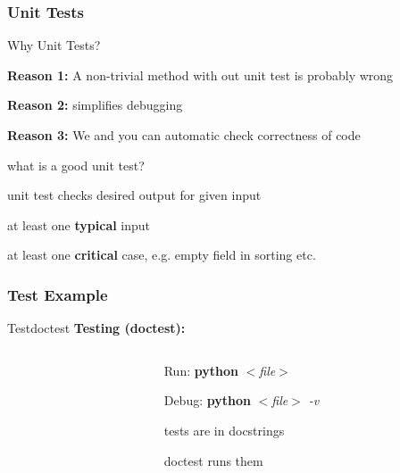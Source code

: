 \documentclass[notes=hide,pdftex,14pt]{beamer}
\def\LectureProgLanguage{python}
\newcommand{\codeslide}[2]{#2}%
\newcommand{\codeslide}[2]{%
    \ifthenelse{\equal{#1}{\LectureProgLanguage}}{#2}{}%
  }%
\begin{document}

\begin{frame}
  \frametitle{Unit Tests}
  \begin{tabl}
  \item Why Unit Tests?
  \eitem
  \begin{tabp}[0.9]
  \item \textbf{Reason 1:} A non-trivial method with out unit test is
    probably wrong
  \item \textbf{Reason 2:} simplifies debugging
  \item \textbf{Reason 3:} We and you can automatic check correctness of code
  \end{tabp}
\eitem
\item what is a good unit test?
\eitem
\begin{tabp}[0.9]
\item unit test checks desired output for given input
\item at least one \textbf{typical} input
\item at least one \textbf{critical} case, e.g. empty field in sorting etc.
\end{tabp}

  \end{tabl}
\end{frame}


\codeslide{python}{
\subsubsection{Test Example}
\begin{frame}{Test}{doctest}
  \textbf{Testing (doctest):}
  \vspace{-1.0em}
  \begin{columns}
    \begin{column}[t]{0.45\linewidth}
      
    \end{column}
    \begin{column}[t]{0.6\linewidth}
      \begin{tabl}
        \item
          Run: \textbf{python} \textit{$<$file$>$}
        \item
          Debug: \textbf{python} \textit{$<$file$>$ -v}
        \eitem
      \item<2-> tests are in docstrings
      \item<3-> doctest runs them 
      \end{tabl}
    \end{column}
  \end{columns}
\end{frame}
}
\end{document}
